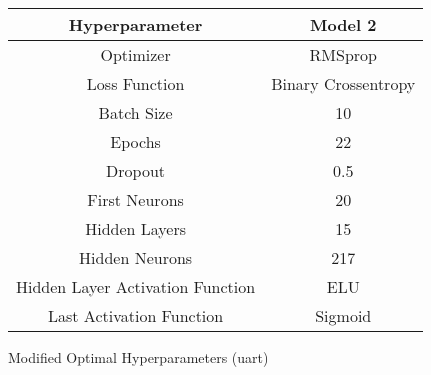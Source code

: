 \begin{tabular}{|c|c|}
    \hline
    Hyperparameter & Model 2\\
    \hline
    \hline
    Optimizer & RMSprop\\
    \hline
    Loss Function & Binary Crossentropy\\
    \hline
    Batch Size & 10\\
    \hline
    Epochs & 22\\
    \hline
    Dropout & 0.5\\
    \hline
    First Neurons & 20\\
    \hline
    Hidden Layers & 15\\
    \hline
    Hidden Neurons & 217\\
    \hline
    Hidden Layer Activation Function & ELU\\
    \hline
    Last Activation Function & Sigmoid\\
    \hline
\end{tabular}
\caption{Modified Optimal Hyperparameters (uart)}
\label{tab: Modified Optimal Hyperparameters uart}